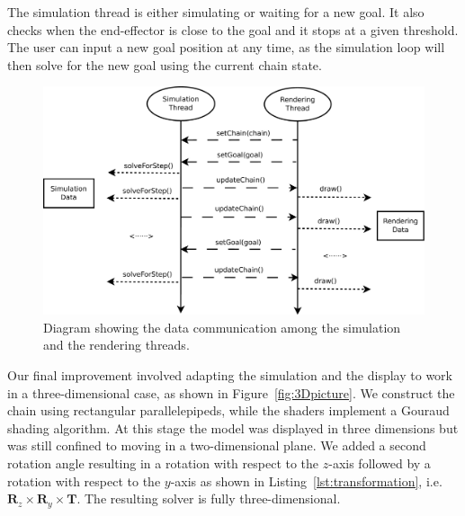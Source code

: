 \documentclass[paper=a4, fontsize=11pt]{scrartcl} %
\numberwithin{equation}{section} %
\numberwithin{figure}{section} %
\numberwithin{table}{section} %
\begin{document}
The simulation thread is either simulating or waiting for a new goal. It also checks when the end-effector is close to the goal and it stops at a given threshold. The user can input a new goal position at any time, as the simulation loop will then solve for the new goal using the current chain state.\\

\begin{figure}[h]
\centering
\includegraphics[scale=0.4]{threadDiagram}
\caption{Diagram showing the data communication among the simulation and the rendering threads.}
\label{fig:treadhDiagram}
\end{figure}

Our final improvement involved adapting the simulation and the display to work in a three-dimensional case, as shown in Figure~\ref{fig:3Dpicture}. We construct the chain using rectangular parallelepipeds, while the shaders implement a Gouraud shading algorithm. At this stage the model was displayed in three dimensions but was still confined to moving in a two-dimensional plane. We added a second rotation angle resulting in a rotation with respect to the \(z\)-axis followed by a rotation with respect to the \(y\)-axis as shown in Listing~\ref{lst:transformation}, i.e. \( \mathbf{R}_z \times \mathbf{R}_y \times \mathbf{T}\). The resulting solver is fully three-dimensional. \\
\end{document}
